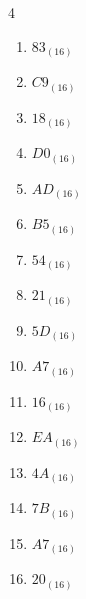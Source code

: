 \begin{multicols}{4}
\begin{enumerate}
  \item $83_{(16)}$

        \phantom{$=131$}

  \item $C9_{(16)}$

        \phantom{$=201$}

  \item $18_{(16)}$

        \phantom{$=24$}

  \item $D0_{(16)}$

        \phantom{$=208$}

  \item $AD_{(16)}$

        \phantom{$=173$}

  \item $B5_{(16)}$

        \phantom{$=181$}

  \item $54_{(16)}$

        \phantom{$=84$}

  \item $21_{(16)}$

        \phantom{$=33$}

  \item $5D_{(16)}$

        \phantom{$=93$}

\columnbreak %

  \item $A7_{(16)}$

        \phantom{$=167$}

  \item $16_{(16)}$

        \phantom{$=22$}

  \item $EA_{(16)}$

        \phantom{$=234$}

  \item $4A_{(16)}$

        \phantom{$=74$}

  \item $7B_{(16)}$

        \phantom{$=123$}

  \item $A7_{(16)}$

        \phantom{$=167$}

  \item $20_{(16)}$


\end{enumerate}
\end{multicols}
